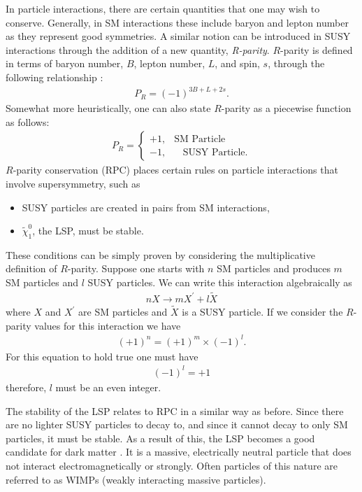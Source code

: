 In particle interactions, there are certain quantities that one may wish to conserve.
Generally, in SM interactions these include baryon and lepton number as they represent good symmetries.
A similar notion can be introduced in SUSY interactions through the addition of a new quantity, \textit{R-parity}.
$R$-parity is defined in terms of baryon number, $B$, lepton number, $L$, and spin, $s$, through the following relationship \cite{martin2010supersymmetry}:
\begin{align}
P_{R} = (-1)^{3B + L + 2s}.
\end{align}
Somewhat more heuristically, one can also state $R$-parity as a piecewise function as follows:
\begin{align}
P_{R} = \left\{\begin{matrix}
+1, & \textrm{SM Particle} \\ 
-1,  & \ \ \ \ \textrm{SUSY Particle}.  
\end{matrix}\right.
\end{align}
$R$-parity conservation (RPC) places certain rules on particle interactions that involve supersymmetry, such as
\begin{itemize}
\item SUSY particles are created in pairs from SM interactions,
\item $\tilde{\chi}^{0}_{1}$, the LSP,  must be stable.
\end{itemize}
These conditions can be simply proven by considering the multiplicative definition of $R$-parity.
Suppose one starts with $n$ SM particles and produces $m$ SM particles and $l$ SUSY particles.
We can write this interaction algebraically as
\begin{align}
n X \rightarrow m X^{\prime} + l \tilde{X}
\end{align}
where $X$ and $X^{\prime}$ are SM particles and $\tilde{X}$ is a SUSY particle.
If we consider the $R$-parity values for this interaction we have
\begin{align}
(+1)^{n} = (+1)^{m} \times (-1)^{l}.
\end{align}
For this equation to hold true one must have
\begin{align}
(-1)^{l} = +1
\end{align}
therefore, $l$ must be an even integer.

The stability of the LSP relates to RPC in a similar way as before. 
Since there are no lighter SUSY particles to decay to, and since it cannot decay to only SM particles, it must be stable.
As a result of this, the LSP becomes a good candidate for dark matter \cite{jungman1996supersymmetric}.
It is a massive, electrically neutral particle that does not interact electromagnetically or strongly.
Often particles of this nature are referred to as WIMPs (weakly interacting massive particles).

